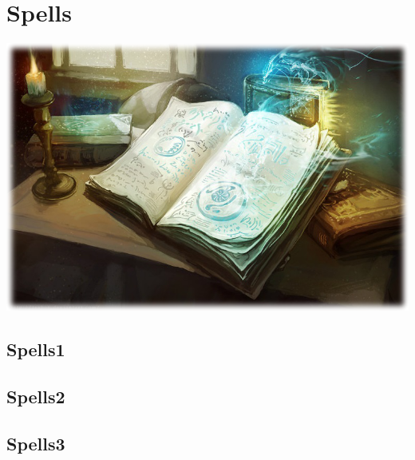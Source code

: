 \clearpage
\section{Spells}
\includegraphics[width=\linewidth]{figures/spells/spellbookTransEdge.jpg}
\lipsum[1]
\subsection{Spells1}
\lipsum[2]
\subsection{Spells2}
\lipsum[2]
\subsection{Spells3}
\lipsum[2]
